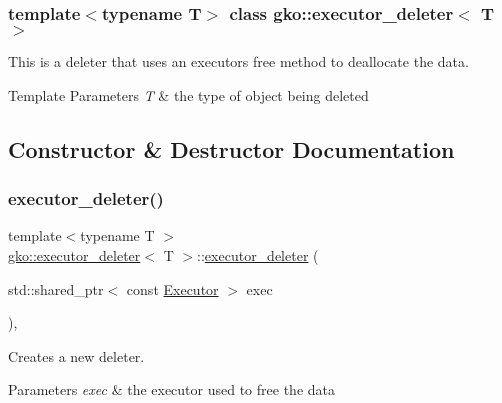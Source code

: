 \subsubsection*{template$<$typename T$>$\newline
class gko\+::executor\+\_\+deleter$<$ T $>$}

This is a deleter that uses an executor\textquotesingle{}s {\ttfamily free} method to deallocate the data. 


\begin{DoxyTemplParams}{Template Parameters}
{\em T} & the type of object being deleted \\
\hline
\end{DoxyTemplParams}


\subsection{Constructor \& Destructor Documentation}
\mbox{\label{classgko_1_1executor__deleter_a260f79ed87560fefc48d52b072bbb776}} 
\subsubsection{\texorpdfstring{executor\+\_\+deleter()}{executor\_deleter()}}
{\footnotesize\ttfamily template$<$typename T $>$ \\
\hyperlink{classgko_1_1executor__deleter}{gko\+::executor\+\_\+deleter}$<$ T $>$\+::\hyperlink{classgko_1_1executor__deleter}{executor\+\_\+deleter} (\begin{DoxyParamCaption}\item[{std\+::shared\+\_\+ptr$<$ const \hyperlink{classgko_1_1Executor}{Executor} $>$}]{exec }\end{DoxyParamCaption})\hspace{0.3cm}{\ttfamily [inline]}, {\ttfamily [explicit]}}



Creates a new deleter. 


\begin{DoxyParams}{Parameters}
{\em exec} & the executor used to free the data \\
\hline
\end{DoxyParams}


